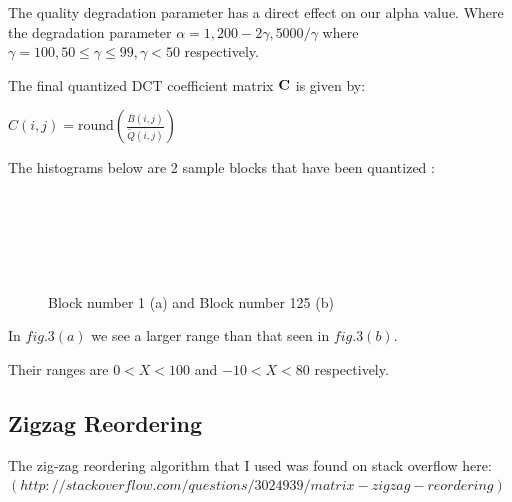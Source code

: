 \documentclass[]{assignment}
\begin{document}
The quality degradation parameter has a direct effect on our alpha value. Where the degradation parameter $\alpha = 1, 200-2\gamma, 5000/\gamma$  where $\gamma = 100, 50 \leq \gamma \leq 99, \gamma < 50$ respectively. 

The final quantized DCT coefficient matrix $\bf C$ is given by:

$C(i,j)=\mathrm{round}\left(\displaystyle\frac{B(i,j)}{\tilde{Q}(i,j)}\right)$ 

The histograms below are 2 sample blocks that have been quantized :

\begin{figure}[h]
\centering
\fboxsep 0mm
\parbox{6cm}{\\}
~~~
\parbox{6cm}{\\}
\caption{\label{fig:imgfilter1} Block number 1 (a) and Block number 125 (b)}
\end{figure} 


In $fig.3(a)$ we see a larger range than that seen in  $fig.3(b)$. 

Their ranges are $0 < X < 100$ and $-10 < X < 80$ respectively. 
\clearpage


\subsection{Zigzag Reordering} 

The zig-zag reordering algorithm that I used was found on stack overflow here: $(http://stackoverflow.com/questions/3024939/matrix-zigzag-reordering)$ 
\end{document}
